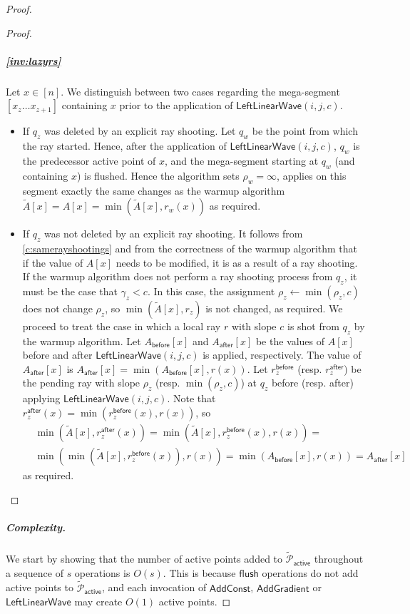 \documentclass[a4paper,UKenglish,cleveref, autoref, thm-restate]{lipics-v2021}
\newcommand{\AC}{\mathsf{AddConst}}
\newcommand{\AG}{\mathsf{AddGradient}}
\newcommand{\LLW}{\mathsf{LeftLinearWave}}
\newcommand{\assign}{\leftarrow}
\newcommand{\local}{\text{short }}
\newcommand{\longrange}{\text{long }}
\renewcommand{\P}{\mathcal{P}}
\newcommand{\TAP}{\tilde{\P}_{\mathsf{active}}}
\newcommand{\TA}{\tilde{A}}
\newcommand{\para}[1]{\vspace{-0.1in} \subparagraph*{#1}}
\newcommand{\ray}{r}
\newcommand{\rl}[1]{\rho_{#1}}
\newcommand{\flush}{\mathsf{flush}}
\begin{document}
\begin{proof}
\begin{proof}
\para{\cref{inv:lazyrs}}
Let $x\in [n]$.
We distinguish between two cases regarding the mega-segment $[x_z \ldots x_{z+1}]$ containing $x$ prior to the application of $\LLW(i,j,c)$.
\begin{itemize}
    \item If $q_z$ was deleted by an explicit \longrange ray shooting.
    Let $q_w$ be the point from which the \longrange ray started. 
    Hence, after the application of $\LLW(i,j,c)$, $q_w$ is the predecessor active point of $x$, and the mega-segment starting at $q_w$ (and containing $x$) is flushed. Hence the algorithm sets $\rl{w} = \infty$, applies on this segment exactly the same changes as the warmup algorithm $\TA[x] = A[x] = \min(\TA[x], \ray_w(x))$ as required.
    \item If $q_z$ was not deleted by an explicit \longrange ray shooting. 
    It follows from \cref{c:samerayshootings} and from the correctness of the warmup algorithm that if the value of $A[x]$ needs to be modified, it is as a result of a \local ray shooting.
    If the warmup algorithm does not perform a ray shooting process from $q_z$, it must be the case that $\gamma_z  < c$.
    In this case, the assignment $\rl{z} \assign \min(\rl{z},c)$ does not change $\rl{z}$, so $\min(\TA[x],\ray_z)$ is not changed, as required.
    We proceed to treat the case in which a local ray $r$ with slope $c$ is shot from $q_z$ by the warmup algorithm.
    Let $A_{\mathsf{before}}[x]$ and $A_{\mathsf{after}}[x]$ be the values of $A[x]$ before and after $\LLW(i,j,c)$ is applied, respectively.
    The value of $A_{\mathsf{after}}[x]$ is $A_{\mathsf{after}}[x] = \min(A_{\mathsf{before}}[x], r(x))$.
    Let $\ray_{z}^{\mathsf{before}}$ (resp. $\ray_{z}^{\mathsf{after}}$) be the pending ray with slope $\rl{z}$ (resp. $\min(\rl{z},c)$) at $q_z$ before  (resp. after) applying $\LLW(i,j,c)$.
Note that $\ray_{z}^{\mathsf{after}}(x) = \min (\ray_{z}^{\mathsf{before}}(x), r(x))$, so
    \begin{align*}
        & \min(\TA[x] ,\ray_{z}^{\mathsf{after}}(x) ) = \min(\TA[x],\ray_{z}^{\mathsf{before}}(x), r(x)) = 
        \\
        & \min(\min(\TA[x],\ray_{z}^{\mathsf{before}}(x)),r(x)) =
        \min(A_{\mathsf{before}}[x] , r(x)) = A_{\mathsf{after}}[x]
    \end{align*}
    as required.\qedhere
\end{itemize}

\end{proof}

\para{Complexity.}
We start by showing that the number of active points added to $\TAP$ throughout a sequence of $s$ operations is $O(s)$.
This is because $\flush$ operations do not add active points to $\TAP$, and 
each invocation of $\AC$, $\AG$ or $\LLW$ may create $O(1)$ active points.


\end{proof}
\end{document}
